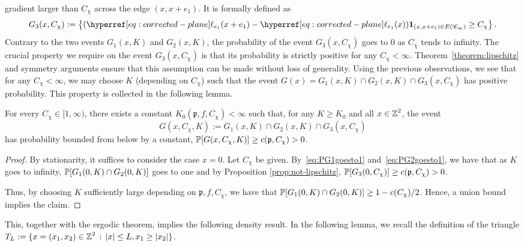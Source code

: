 \documentclass[12pt]{amsart}
\numberwithin{equation}{section}
\begin{document}
	gradient larger than $C_\chi$ across the edge $(x, x+e_1)$. It is formally defined as
	\begin{equation} \label{eq:not-lipschitz}
		G_3(x,  C_{\chi}) := \left\{  (\ellp{e_1}(x + e_1) - \ellp{e_1}(x) )\indc_{(x, x+e_1) \in E(\mathscr{C}_\infty)} \geq C_\chi  \right\}.
	\end{equation}
	Contrary to the two events $G_1(x , K)$ and $G_2(x,K)$, the probability of the event $G_3(x, C_{\chi})$ goes to $0$ as $C_{\chi}$ tends to infinity. The crucial property we require on the event $G_3(x , C_{\chi})$ is that its probability is strictly positive for any $C_{\chi} < \infty$. Theorem~\ref{theorem:lipschitz} and symmetry arguments ensure that this assumption can be made without loss of generality. Using the previous observations, we see that for any $C_\chi < \infty$, we may choose $K$ (depending on $C_\chi$) such that the event $G(x) = G_1(x, K) \cap G_2(x , K) \cap G_3(x,  C_{\chi})$ has positive probability. This property is collected in the following lemma.
	
	\begin{lemma} \label{lemma:good-event-lower-bound}
		For every $C_{\chi} \in [1 , \infty)$, there exists a constant $K_0(\mathfrak{p} , f , C_\chi) < \infty$ such that, for any $K \geq K_0$ and all $x \in \Z^2$, the event 
		\begin{equation} \label{eq:def-good-event}
			G(x, C_\chi , K) := G_1(x, K) \cap G_2(x, K) \cap G_3(x, C_{\chi})
		\end{equation}
		has probability bounded from below by a constant, $\P[G(x , C_\chi , K )] \geq c(\mathfrak{p} , C_\chi) > 0$.     
	\end{lemma}
	
	\begin{proof}
		By stationarity, it suffices to consider the case $x = 0$.  Let $C_{\chi}$ be given. 
		By~\eqref{eq:PG1goesto1} and~\eqref{eq:PG2goesto1}, we have that as $K$ goes to infinity, $\P[G_1(0 , K) \cap G_2(0 , K)]$ goes to one
		and by Proposition \ref{prop:not-lipschitz}, $\P[G_3(0 , C_\chi)] \geq c(\mathfrak{p}, C_{\chi}) > 0$. 
		
		Thus, by choosing $K$ sufficiently large depending on $\mathfrak{p}, f , C_{\chi}$,  we have that  $\P[G_1(0 , K) \cap G_2(0 , K)] \geq 1 - c(C_{\chi})/2$. 
		Hence, a union bound implies the claim. \end{proof}
	
	
	This, together with the ergodic theorem, implies the following density result. In the following lemma, we recall the definition of the triangle $T_L := \{ x = (x_1 , x_2) \in \Z^2 \, : \, |x| \leq L, x_1 \geq |x_2|\}$.
	
\end{document}
